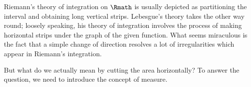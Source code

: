 \label{chap:lebesgue}

Riemann's theory of integration on \(\Rmath\) is usually depicted as
partitioning the interval and obtaining long vertical strips.
Lebesgue's theory takes the other way round;
loosely speaking, his theory of integration involves the process of
making horizontal strips under the graph of the given function.
What seems miraculous is the fact that
a simple change of direction resolves a lot of irregularities
which appear in Riemann's integration.

But what do we actually mean by cutting the area horizontally?
To answer the question, we need to introduce the concept of measure.